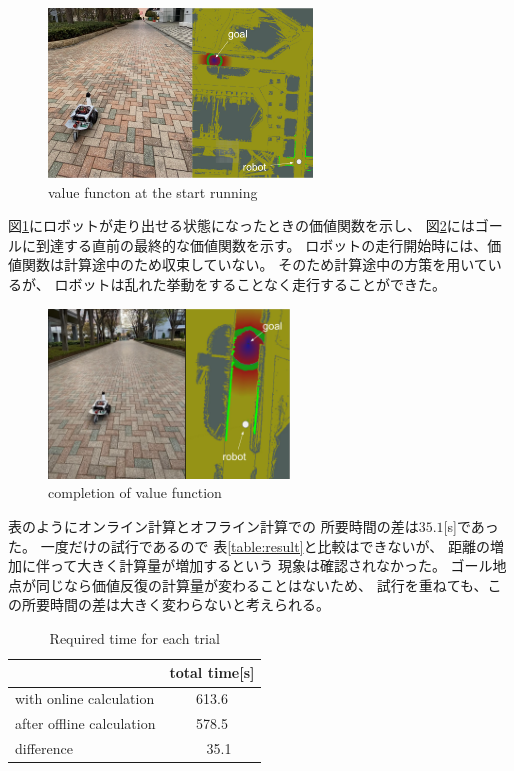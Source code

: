 \documentclass{jarticle}
\begin{document}
\begin{figure}[htb]
  \centering
   \includegraphics[height=45mm]{./figs/raspicat-long-value.png}
   \caption{value functon at the start running}
	\label{fig:raspicat-long-path}
\end{figure}

図\ref{fig:raspicat-long-path}にロボットが走り出せる状態になったときの価値関数を示し、
図\ref{fig:raspicat-value-function}にはゴールに到達する直前の最終的な価値関数を示す。
ロボットの走行開始時には、価値関数は計算途中のため収束していない。
そのため計算途中の方策を用いているが、
ロボットは乱れた挙動をすることなく走行することができた。

\begin{figure}[htb]
  \centering
   \includegraphics[height=45mm]{./figs/raspicat-value-function.png}
   \caption{completion of value function}
	\label{fig:raspicat-value-function}
\end{figure}

表のようにオンライン計算とオフライン計算での
所要時間の差は$35.1$[s]であった。
一度だけの試行であるので
表\ref{table:result}と比較はできないが、
距離の増加に伴って大きく計算量が増加するという
現象は確認されなかった。
ゴール地点が同じなら価値反復の計算量が変わることはないため、
試行を重ねても、この所要時間の差は大きく変わらないと考えられる。

\begin{table}[hbtp]
	\caption{Required time for each trial}
	\label{table:result2}
	\centering
	\begin{small}
	 \begin{tabular}{l|c}
		\hline
		 & total time[s] \\
		\hline \hline
		with online calculation & 613.6 \\
		after offline calculation & 578.5 \\
		\hline
		 difference & \ \ 35.1 \\
		\hline
	 \end{tabular}
	\end{small}
\end{table}
\end{document}
